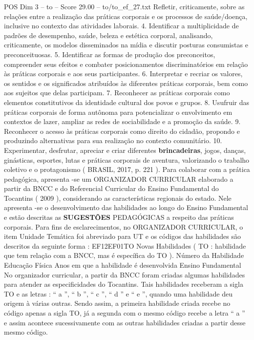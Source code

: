 \begin{textsample}{POS Dim 3 – to – Score 29.00 – to/to\_ef\_27.txt}
Refletir, criticamente, sobre as relações entre a realização das práticas corporais e os processos de saúde/doença, inclusive no contexto das atividades laborais. 4.
Identificar a multiplicidade de padrões de desempenho, saúde, beleza e estética corporal, analisando, criticamente, os modelos disseminados na mídia e discutir posturas consumistas e preconceituosas. 5.
Identificar as formas de produção dos preconceitos, compreender seus efeitos e combater posicionamentos discriminatórios em relação às práticas corporais e aos seus participantes. 6.
Interpretar e recriar os valores, os sentidos e os significados atribuídos às diferentes práticas corporais, bem como aos sujeitos que delas participam. 7.
Reconhecer as práticas corporais como elementos constitutivos da identidade cultural dos povos e grupos. 8.
Usufruir das práticas corporais de forma autônoma para potencializar o envolvimento em contextos de lazer, ampliar as redes de sociabilidade e a promoção da saúde. 9.
Reconhecer o acesso às práticas corporais como direito do cidadão, propondo e produzindo alternativas para sua realização no contexto comunitário. 10.
Experimentar, desfrutar, apreciar e criar diferentes \textbf{brincadeiras}, jogos, danças, ginásticas, esportes, lutas e práticas corporais de aventura, valorizando o trabalho coletivo e o protagonismo ( BRASIL, 2017, p. 221 ).
Para colaborar com a prática pedagógica, apresenta -se um ORGANIZADOR CURRICULAR elaborado a partir da BNCC e do Referencial Curricular do Ensino Fundamental do Tocantins ( 2009 ), considerando as características regionais do estado.
Nele apresenta -se o desenvolvimento das habilidades ao longo do Ensino Fundamental e estão descritas as \textbf{SUGESTÕES} PEDAGÓGICAS a respeito das práticas corporais.
Para fins de esclarecimentos, no ORGANIZADOR CURRICULAR, o item Unidade Temática foi abreviado para UT e os códigos das habilidades são descritos da seguinte forma : EF12EF01TO Novas Habilidades ( TO : habilidade que tem relação com a BNCC, mas é específica do TO ).
Número da Habilidade Educação Física Anos em que a habilidade é desenvolvida Ensino Fundamental No organizador curricular, a partir da BNCC foram criadas algumas habilidades para atender as especificidades do Tocantins.
Tais habilidades receberam a sigla TO e as letras : “ a ”, “ b ”, “ c ”, “ d ” e “ e ”, quando uma habilidade deu origem à várias outras.
Sendo assim, a primeira habilidade criada recebe no código apenas a sigla TO, já a segunda com o mesmo código recebe a letra “ a ” e assim acontece sucessivamente com as outras habilidades criadas a partir desse mesmo código.

\end{textsample}
